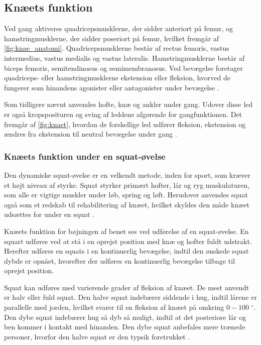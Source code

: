 \subsection{Knæets funktion}
Ved gang aktiveres quadricepsmusklerne, der sidder anteriort på femur, og hamstringmusklerne, der sidder poseriort på femur, hvilket fremgår af \autoref{fig:knae_anatomi}. Quadricepsmusklerne består af rectus femoris, vastus intermedius, vastus medialis og vastus lateralis. Hamstringmusklerne består af biceps femoris, semitendinosus og semimembranosus. Ved bevægelse foretager quadriceps- eller hamstringmusklerne ekstension eller fleksion, hvorved de fungerer som hinandens agonister eller antagonister under bevægelse \citep{martini2012}. 

Som tidligere nævnt anvendes hofte, knæ og ankler under gang. Udover disse led er også kropsposituren og sving af leddene afgørende for gangfunktionen. Det fremgår af \autoref{fig:knaet}, hvordan de forskellige led udfører fleksion, ekstension og ændres fra ekstension til neutral bevægelse under gang \citep{martini2012}.

\subsubsection{Knæets funktion under en squat-øvelse}
Den dynamiske squat-øvelse er en velkendt metode, inden for sport, som kræver et højt niveau af styrke. Squat styrker primært hofter, lår og ryg muskulaturen, som alle er vigtige muskler under løb, spring og løft. Herudover anvendes squat også som et redskab til rehabilitering af knæet, hvilket skyldes den måde knæet udsættes for under en squat \citep{escamilla2001}. 

Knæets funktion for bøjningen af benet ses ved udførelse af en squat-øvelse. En squart udføres ved at stå i en oprejst position
med knæ og hofter fuldt udstrakt. Herefter udføres en
squats i en kontinuerlig bevægelse, indtil den ønskede squat
dybde er opnået, hvorefter der udføres en kontinuerlig bevægelse
tilbage til oprejst position.

Squat kan udføres med varierende grader af fleksion af knæet. De mest anvendt er halv eller fuld squat. Den halve squat indebærer siddende i hug, indtil lårene er parallelle med jorden, hvilket svarer til en fleksion af knæet på omkring $0-100$ $^{\circ}$. Den dybe squat indebærer hug så dyb så muligt, indtil at det posteriore lår og ben kommer i kontakt med hinanden. Den dybe squat anbefales mere trænede personer, hvorfor den halve squat er den typsik foretrukket \citep{escamilla2001}.

